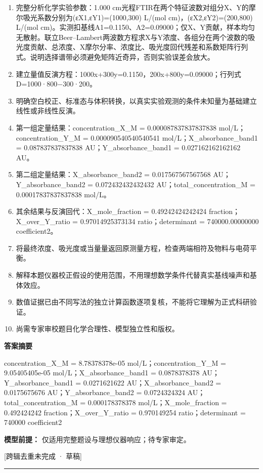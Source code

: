 \documentclass[UTF8,11pt,a4paper]{ctexart}
\begin{document}
\begin{enumerate}
\item 完整分析化学实验参数：1.000 cm光程FTIR在两个特征波数对组分X、Y的摩尔吸光系数分别为(εX1,εY1)=(1000,300) L/(mol cm)，(εX2,εY2)=(200,800) L/(mol cm)。实测扣基线A1=0.1150、A2=0.09000；仅X、Y贡献，样本均匀无散射。联立Beer–Lambert两波数方程求X与Y浓度、各组分在两个波数的吸光度贡献、总浓度、X摩尔分率、浓度比、吸光度回代残差和系数矩阵行列式。说明选择谱带必须避免矩阵近奇异，否则实验误差会放大。
\item 建立量值反演方程：1000x+300y=0.1150，200x+800y=0.09000；行列式D=1000·800−300·200。
\item 明确空白校正、标准态与体积转换，以真实实验观测的条件未知量为基础建立线性或非线性反演。
\item 第一组定量结果：concentration\_X\_M = 0.000087837837837838 mol/L；concentration\_Y\_M = 0.000090540540540541 mol/L；X\_absorbance\_band1 = 0.087837837837838 AU；Y\_absorbance\_band1 = 0.027162162162162 AU。
\item 第二组定量结果：X\_absorbance\_band2 = 0.017567567567568 AU；Y\_absorbance\_band2 = 0.072432432432432 AU；total\_concentration\_M = 0.00017837837837838 mol/L。
\item 其余结果与反演回代：X\_mole\_fraction = 0.49242424242424 fraction；X\_over\_Y\_ratio = 0.97014925373134 ratio；determinant = 740000.00000000 coefficient2。
\item 将最终浓度、吸光度或当量量返回原测量方程，检查两端相符及物料与电荷平衡。
\item 解释本题仪器校正假设的使用范围，不用理想数学条件代替真实基线噪声和基体效应。
\item 数值证据已由不同写法的独立计算函数逐项复核，不能将它理解为正式科研验证。
\item 尚需专家审校题目化学合理性、模型独立性和版权。
\end{enumerate}
\noindent\textbf{答案摘要}\par
concentration\_X\_M = 8.78378378e-05 mol/L；concentration\_Y\_M = 9.05405405e-05 mol/L；X\_absorbance\_band1 = 0.0878378378 AU；Y\_absorbance\_band1 = 0.0271621622 AU；X\_absorbance\_band2 = 0.0175675676 AU；Y\_absorbance\_band2 = 0.0724324324 AU；total\_concentration\_M = 0.000178378378 mol/L；X\_mole\_fraction = 0.492424242 fraction；X\_over\_Y\_ratio = 0.970149254 ratio；determinant = 740000 coefficient2\par
\noindent\textbf{模型前提：}
仅适用完整题设与理想仪器响应；待专家审定。\par
\noindent\textcolor{red!65!black}{[跨辑去重未完成 · 草稿]} \par
\medskip\hrule\medskip
{}
\end{document}

